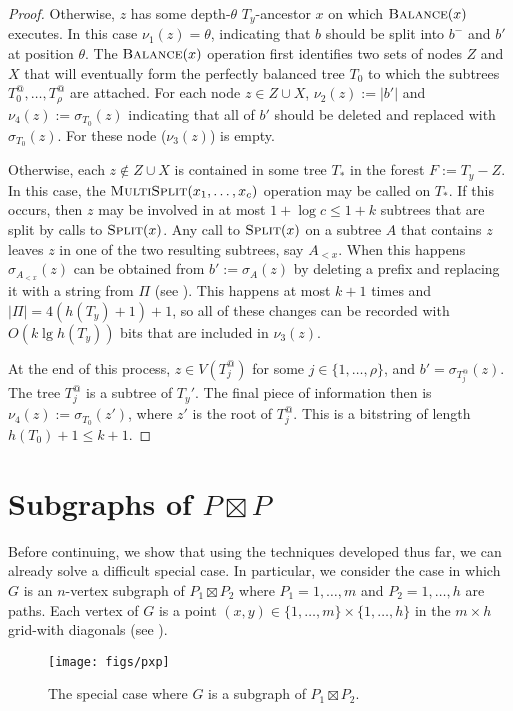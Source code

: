 \documentclass[kpfonts]{patmorin}
\let\le\leqslant
\begin{document}
\begin{proof}
  Otherwise, $z$ has some depth-$\theta$ $T_y$-ancestor $x$ on which $\textsc{Balance}(x)$ executes. In this case $\nu_{1}(z)=\theta$, indicating that $b$ should be split into $b^-$ and $b'$ at position $\theta$.  
  The $\textsc{Balance}(x)$ operation first identifies two sets of nodes $Z$ and $X$ that will eventually form the perfectly balanced tree $T_0$ to which the subtrees $T^@_0,\ldots,T^@_\rho$ are attached.  For each node $z\in Z\cup X$, $\nu_{2}(z):=|b'|$ and $\nu_{4}(z):=\sigma_{T_0}(z)$ indicating that all of $b'$ should be deleted and replaced with $\sigma_{T_0}(z)$.  For these node ($\nu_3(z)$) is empty.
    
  Otherwise, each $z\not\in Z\cup X$ is contained in some tree $T_*$ in the forest $F:=T_y-Z$.  In this case, the $\textsc{MultiSplit}(x_1,\ldots,x_c)$ operation may be called on $T_*$.  If this occurs, then $z$ may be involved in at most $1+\log c\le 1+k$ subtrees that are split by calls to $\textsc{Split}(x)$.  Any call to $\textsc{Split}(x)$ on a subtree $A$ that contains $z$ leaves $z$ in one of the two resulting subtrees, say $A_{<x}$.  When this happens $\sigma_{A_{<x}}(z)$ can be obtained from $b':=\sigma_{A}(z)$ by deleting a prefix and replacing it with a string from $\Pi$ (see ).  This happens at most $k+1$ times and $|\Pi|= 4(h(T_y)+1)+1$, so all of these changes can be recorded with $O(k\lg h(T_y))$ bits that are included in $\nu_{3}(z)$.
  
  At the end of this process, $z\in V(T^@_j)$ for some $j\in\{1,\ldots,\rho\}$, and $b'=\sigma_{T^@_j}(z)$.  The tree $T^@_j$ is a subtree of $T_y'$.  The final piece of information then is $\nu_4(z):=\sigma_{T_0}(z')$, where $z'$ is the root of $T^@_j$.  This is a bitstring of length $h(T_0)+1\le k+1$.
\end{proof}

\section{Subgraphs of $P\boxtimes P$}

Before continuing, we show that using the techniques developed thus far, we can already solve a difficult special case.  In particular, we consider the case in which $G$ is an $n$-vertex subgraph of $P_1\boxtimes P_2$ where $P_1=1,\ldots,m$ and $P_2=1,\ldots,h$ are paths. Each vertex of $G$ is a point $(x,y)\in\{1,\ldots,m\}\times \{1,\ldots,h\}$ in the $m\times h$ grid-with diagonals (see ).

\begin{figure}
  \begin{center}
    \texttt{[image: figs/pxp]}
  \end{center}
  \caption{The special case where $G$ is a subgraph of $P_1\boxtimes P_2$.}
\end{figure}
\end{document}
